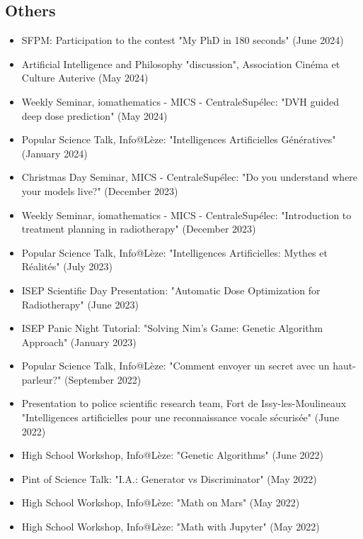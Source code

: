 \subsection*{Others}
\begin{itemize}
	\item SFPM: Participation to the contest "My PhD in 180 seconds" (June 2024)
	\item Artificial Intelligence and Philosophy "discussion", Association Cinéma et Culture Auterive (May 2024)
	\item Weekly Seminar, \textbeta iomathematics - MICS - CentraleSupélec: "DVH guided deep dose prediction" (May 2024) 
	\item Popular Science Talk, Info@Lèze: "Intelligences Artificielles Génératives" (January 2024)
	\item Christmas Day Seminar, MICS - CentraleSupélec: "Do you understand where your models live?" (December 2023)
	\item Weekly Seminar, \textbeta iomathematics - MICS - CentraleSupélec: "Introduction to treatment planning in radiotherapy" (December 2023) 
	\item Popular Science Talk, Info@Lèze: "Intelligences Artificielles: Mythes et Réalités" (July 2023)
	\item ISEP Scientific Day Presentation: "Automatic Dose Optimization for Radiotherapy" (June 2023)
	\item ISEP Panic Night Tutorial: "Solving Nim's Game: Genetic Algorithm Approach" (January 2023)
	\item Popular Science Talk, Info@Lèze: "Comment envoyer un secret avec un haut-parleur?" (September 2022)
	\item Presentation to police scientific research team, Fort de Issy-les-Moulineaux "Intelligences artificielles pour une reconnaissance vocale sécurisée" (June 2022)
	\item High School Workshop, Info@Lèze: "Genetic Algorithms" (June 2022)
	\item Pint of Science Talk: "I.A.: Generator vs Discriminator" (May 2022)
	\item High School Workshop, Info@Lèze: "Math on Mars" (May 2022)
	\item High School Workshop, Info@Lèze: "Math with Jupyter" (May 2022)
\end{itemize}

